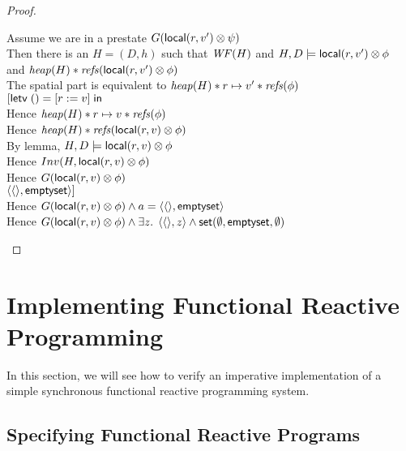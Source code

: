 \begin{proof}
\begin{tabbedproof}
\oo Assume we are in a prestate $G(\mathsf{local}({r}, {v'}) \otimes \psi)$ \\
\oo Then there is an $H = (D,h)$ such that $\mathit{WF}(H)$ and $H, D \models \mathsf{local}({r}, {v'}) \otimes \phi$ \\
\oo and $\mathit{heap}(H) * \mathit{refs}(\mathsf{local}({r}, {v'}) \otimes \phi)$\\
\oo The spatial part is equivalent to $\mathit{heap}(H) * r \mapsto v' * \mathit{refs}(\phi)$ \\
\oo $[\mathsf{letv}\;() = [r := v]\;\mathsf{in}\;$ \\
\oo Hence $\mathit{heap}(H) * r \mapsto v * \mathit{refs}(\phi)$ \\
\oo Hence $\mathit{heap}(H) * \mathit{refs}(\mathsf{local}({r}, {v}) \otimes \phi)$ \\
\oo By lemma, $H, D \models \mathsf{local}({r}, {v}) \otimes \phi$ \\
\oo Hence $Inv(H, \mathsf{local}({r}, {v}) \otimes \phi)$ \\
\oo Hence $G(\mathsf{local}({r}, {v}) \otimes \phi)$ \\
\oo $\left<{\left<\right>},{\mathsf{emptyset}}\right>]$ \\
\oo Hence $G(\mathsf{local}({r}, {v}) \otimes \phi) \land a = \left<{\left<\right>},{\mathsf{emptyset}}\right>$ \\
\oo Hence $G(\mathsf{local}({r}, {v}) \otimes \phi) \land \exists z.\; \left<{\left<\right>},{z}\right> \land \mathsf{set}(\emptyset, \mathsf{emptyset}, \emptyset)$ \\
\end{tabbedproof}
\end{proof}

\section{Implementing Functional Reactive Programming}

In this section, we will see how to verify an imperative
implementation of a simple synchronous functional reactive programming
system.

\subsection{Specifying Functional Reactive Programs}

